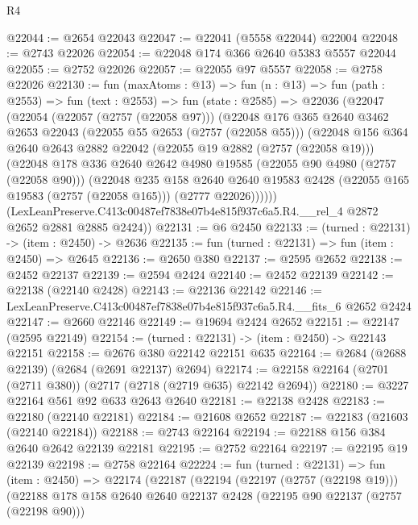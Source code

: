 \begin{lexlean}{R4}
\begin{coremodule}
@22044 := @2654 @22043
@22047 := @22041 (@5558 @22044) @22004
@22048 := @2743 @22026
@22054 := @22048 @174 @366 @2640 @5383 @5557 @22044
@22055 := @2752 @22026
@22057 := @22055 @97 @5557
@22058 := @2758 @22026
@22130 := fun (maxAtoms : @13) =>
  fun (n : @13) =>
  fun (path : @2553) =>
  fun (text : @2553) =>
  fun (state : @2585) =>
  @22036
    (@22047
      (@22054
        (@22057 (@2757 (@22058 @97)))
        (@22048
          @176
          @365
          @2640
          @3462
          @2653
          @22043
          (@22055 @55 @2653 (@2757 (@22058 @55)))
          (@22048
            @156
            @364
            @2640
            @2643
            @2882
            @22042
            (@22055 @19 @2882 (@2757 (@22058 @19)))
            (@22048
              @178
              @336
              @2640
              @2642
              @4980
              @19585
              (@22055 @90 @4980 (@2757 (@22058 @90)))
              (@22048
                @235
                @158
                @2640
                @2640
                @19583
                @2428
                (@22055 @165 @19583 (@2757 (@22058 @165)))
                (@2777 @22026))))))
      (LexLeanPreserve.C413c00487ef7838e07b4e815f937c6a5.R4.__rel_4 @2872 @2652 @2881 @2885 @2424))
@22131 := @6 @2450
@22133 := (turned : @22131) -> (item : @2450) -> @2636
@22135 := fun (turned : @22131) => fun (item : @2450) => @2645
@22136 := @2650 @380
@22137 := @2595 @2652
@22138 := @2452 @22137
@22139 := @2594 @2424
@22140 := @2452 @22139
@22142 := @22138 (@22140 @2428)
@22143 := @22136 @22142
@22146 := LexLeanPreserve.C413c00487ef7838e07b4e815f937c6a5.R4.__fits_6 @2652 @2424
@22147 := @2660 @22146
@22149 := @19694 @2424 @2652
@22151 := @22147 (@2595 @22149)
@22154 := (turned : @22131) -> (item : @2450) -> @22143 @22151
@22158 := @2676 @380 @22142 @22151 @635
@22164 := @2684 (@2688 @22139) (@2684 (@2691 @22137) @2694)
@22174 := @22158 @22164 (@2701 (@2711 @380)) (@2717 (@2718 (@2719 @635) @22142 @2694))
@22180 := @3227 @22164 @561 @92 @633 @2643 @2640
@22181 := @22138 @2428
@22183 := @22180 (@22140 @22181)
@22184 := @21608 @2652
@22187 := @22183 (@21603 (@22140 @22184))
@22188 := @2743 @22164
@22194 := @22188 @156 @384 @2640 @2642 @22139 @22181
@22195 := @2752 @22164
@22197 := @22195 @19 @22139
@22198 := @2758 @22164
@22224 := fun (turned : @22131) =>
  fun (item : @2450) =>
  @22174
    (@22187
      (@22194
        (@22197 (@2757 (@22198 @19)))
        (@22188
          @178
          @158
          @2640
          @2640
          @22137
          @2428
          (@22195 @90 @22137 (@2757 (@22198 @90)))

\end{coremodule}
\end{lexlean}
